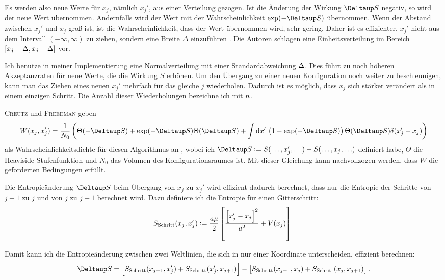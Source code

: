 Es werden also neue Werte für $x_j$, nämlich $x_j'$, aus einer Verteilung
gezogen. Ist die Änderung der Wirkung $\Deltaup S$ negativ, so wird der neue
Wert übernommen. Andernfalls wird der Wert mit der Wahrscheinlichkeit
$\exp(-\Deltaup S)$ übernommen. Wenn der Abstand zwischen $x_j'$ und $x_j$ groß
ist, ist die Wahrscheinlichkeit, dass der Wert übernommen wird, sehr gering.
Daher ist es effizienter, $x_j'$ nicht aus dem Intervall $(-\infty, \infty)$ zu
ziehen, sondern eine Breite $\Delta$ einzuführen
\parencite[439]{Creutz/Statistical_Approach_QM}. Die Autoren schlagen eine
Einheitsverteilung im Bereich $[x_j - \Delta, x_j + \Delta]$ vor.

Ich benutze in meiner Implementierung eine Normalverteilung mit einer
Standardabweichung $\Delta$. Dies führt zu noch höheren Akzeptanzraten für
neue Werte, die die Wirkung $S$ erhöhen. Um den Übergang zu einer neuen
Konfiguration noch weiter zu beschleunigen, kann man das Ziehen eines neuen
$x_j'$ mehrfach für das gleiche $j$ wiederholen. Dadurch ist es möglich, dass
$x_j$ sich stärker verändert als in einem einzigen Schritt. Die Anzahl dieser
Wiederholungen bezeichne ich mit $\bar n$.

\textsc{Creutz} und \textsc{Freedman} geben
\[
    W(x_j, x_j') = \frac1{N_0} \del{
        \Theta(-\Deltaup S) + \exp(- \Deltaup S) \Theta(\Deltaup S)
        + \int \dif x' \, \del{
            1 - \exp(-\Deltaup S)
        } \Theta(\Deltaup S) \delta(x_j' - x_j)
    }
\]
als Wahrscheinlichkeitsdichte für diesen Algorithmus an
\parencite[(3.28)]{Creutz/Statistical_Approach_QM}, wobei ich $\Deltaup S :=
S(\ldots, x_j', \ldots) - S(\ldots, x_j, \ldots)$ definiert habe, $\Theta$ die
Heaviside Stufenfunktion und $N_0$ das Volumen des Konfigurationsraumes ist.
Mit dieser Gleichung kann nachvollzogen werden, dass $W$ die geforderten
Bedingungen erfüllt.

Die Entropieänderung $\Deltaup S$ beim Übergang von $x_j$ zu $x_j'$ wird
effizient dadurch berechnet, dass nur die Entropie der Schritte von $j-1$ zu
$j$ und von $j$ zu $j+1$ berechnet wird. Dazu definiere ich die Entropie für
einen Gitterschritt:
\[
    S_\text{Schritt}(x_j, x_j') := \frac{\timestep \mass}2 \sbr{
    \frac{\sbr{x_j' - x_j}^2}{\timestep^2} + V(x_j)}.
\]

Damit kann ich die Entropieänderung zwischen zwei Weltlinien, die sich in nur
einer Koordinate unterscheiden, effizient berechnen:
\[
    \Deltaup S =
    \sbr{S_\text{Schritt}(x_{j-1}, x_{j}') + S_\text{Schritt}(x_{j}', x_{j+1})}
    -
    \sbr{S_\text{Schritt}(x_{j-1}, x_{j}) + S_\text{Schritt}(x_{j}, x_{j+1})}.
\]

